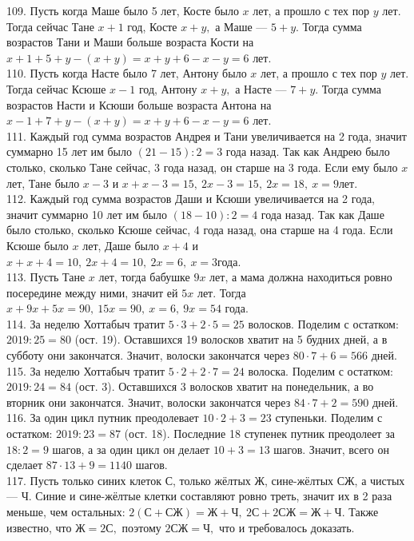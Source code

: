 109. Пусть когда Маше было 5 лет, Косте было $x$ лет, а прошло с тех пор $y$ лет. Тогда сейчас Тане $x+1$ год, Косте $x+y,$ а Маше --- $5+y.$ Тогда сумма возрастов Тани и Маши больше возраста Кости на $x+1+5+y-(x+y)=x+y+6-x-y=6$ лет.\\
110. Пусть когда Насте было 7 лет, Антону было $x$ лет, а прошло с тех пор $y$ лет. Тогда сейчас Ксюше $x-1$ год, Антону $x+y,$ а Насте --- $7+y.$ Тогда сумма возрастов Насти и Ксюши больше возраста Антона на $x-1+7+y-(x+y)=x+y+6-x-y=6$ лет.\\
111. Каждый год сумма возрастов Андрея и Тани увеличивается на 2 года, значит суммарно 15 лет им было $(21-15):2=3$ года назад. Так как Андрею было столько, сколько Тане сейчас, 3 года назад, он старше на 3 года. Если ему было $x$ лет, Тане было $x-3$ и $x+x-3=15,\ 2x-3=15,\ 2x=18,\ x=9$лет.\\
112. Каждый год сумма возрастов Даши и Ксюши увеличивается на 2 года, значит суммарно 10 лет им было $(18-10):2=4$ года назад. Так как Даше было столько, сколько Ксюше сейчас, 4 года назад, она старше на 4 года. Если Ксюше было $x$ лет, Даше было $x+4$ и $x+x+4=10,\ 2x+4=10,\ 2x=6,\ x=3$года.\\
113. Пусть Тане $x$ лет, тогда бабушке $9x$ лет, а мама должна находиться ровно посередине между ними, значит ей $5x$ лет. Тогда $x+9x+5x=90,\ 15x=90,\ x=6,\ 9x=54$ года.\\
114. За неделю Хоттабыч тратит $5\cdot3+2\cdot5=25$ волосков. Поделим с остатком: $2019:25=80$ (ост. 19). Оставшихся 19 волосков хватит на 5 будних дней, а в субботу они закончатся. Значит, волоски закончатся через $80\cdot7+6=566$ дней.\\
115. За неделю Хоттабыч тратит $5\cdot2+2\cdot7=24$ волоска. Поделим с остатком: $2019:24=84$ (ост. 3). Оставшихся 3 волосков хватит на понедельник, а во вторник они закончатся. Значит, волоски закончатся через $84\cdot7+2=590$ дней.\\
116. За один цикл путник преодолевает $10\cdot2+3=23$ ступеньки. Поделим с остатком: $2019:23=87$ (ост. 18). Последние 18 ступенек путник преодолеет за $18:2=9$ шагов, а за один цикл он делает $10+3=13$ шагов. Значит, всего он сделает $87\cdot13+9=1140$ шагов.\\
117. Пусть только синих клеток С, только жёлтых Ж, сине-жёлтых СЖ, а чистых --- Ч. Синие и сине-жёлтые клетки составляют ровно треть, значит их в 2 раза меньше, чем остальных: $2(\text{С}+\text{СЖ})=\text{Ж}+\text{Ч},\ 2\text{С}+2\text{СЖ}=\text{Ж}+\text{Ч}.$ Также известно, что $\text{Ж}=2\text{С},$ поэтому $2\text{СЖ}=\text{Ч},$ что и требовалось доказать.\\
